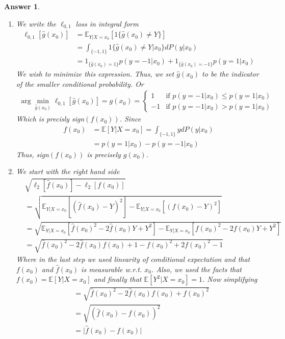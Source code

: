 \documentclass[12pt]{article}
\theoremstyle{colon}
\newtheorem*{answer}{Answer}
\begin{document}
\begin{answer}
  \leavevmode
  \begin{enumerate}[label=\arabic*)]
    \item We write the $\ell_{0,1}$ loss in integral form
      \begin{align*}
        \ell_{0,1}[\widehat{g}(x_0)] &= \mathbb{E}_{Y|X=x_0}[ 1\{ \widehat{g}(x_0) \neq Y \} ] \\
        &= \int_{\{-1,1\}} 1\{ \widehat{g}(x_0) \neq Y | x_0 \} dP(y | x_0) \\
        &=1_{\{ \widehat{g}(x_0) = 1 \}}p(y = -1 | x_0) + 1_{\{ \widehat{g}(x_0) = -1 \}}p(y = 1 | x_0)
      \end{align*}
      We wish to minimize this expression. Thus, we set $\widehat{g}(x_0)$ to be the indicator of the smaller conditional probability. Or
      \begin{gather*}
        \arg\min_{\widehat{g}(x_0)} \ell_{0,1}[\widehat{g}(x_0)] = g(x_0) = \begin{cases}
            1 & \text{if } p(y = -1 | x_0) \leq p(y = 1 | x_0) \\
            -1 & \text{if } p(y = -1 | x_0) > p(y = 1 | x_0)
        \end{cases}
      \end{gather*}
      Which is precisly sign$(f(x_0))$. Since
      \begin{align*}
         f(x_0) &= \mathbb{E}[Y | X = x_0] = \int_{\{-1,1\}} y dP(y | x_0)\\
         &= p(y = 1 | x_0) - p(y = -1 | x_0)
      \end{align*}
      Thus, sign$(f(x_0))$ is precisely $g(x_0)$.

    \item We start with the right hand side
      \begin{align*}
        &  \sqrt{\ell_2[\widehat{f}(x_0)] - \ell_2[f(x_0)]} \\
        &= \sqrt{\mathbb{E}_{Y|X=x_0}[(\widehat{f}(x_0) - Y)^2] - \mathbb{E}_{Y|X=x_0}[(f(x_0) - Y)^2]} \\
        &= \sqrt{\mathbb{E}_{Y|X=x_0}[\widehat{f}(x_0)^2 -2 \widehat{f}(x_0) Y  + Y^2] - \mathbb{E}_{Y|X=x_0}[f(x_0)^2 -2 f(x_0) Y  + Y^2]} \\
        &= \sqrt{\widehat{f}(x_0)^2 -2 \widehat{f}(x_0) f(x_0)  + 1 - f(x_0)^2 + 2 f(x_0)^2  - 1}
      \end{align*}
      Where in the last step we used linearity of conditional expectation and that $f(x_0)$ and $\widehat{f}(x_0)$ is measurable w.r.t. $x_0$. Also, we used the facts that $f(x_0) = \mathbb{E}[Y | X = x_0]$ and finally that $\mathbb{E}[Y^2 | X = x_0] = 1$. Now simplifying
      \begin{align*}
        &= \sqrt{\widehat{f}(x_0)^2 -2 \widehat{f}(x_0) f(x_0)  + f(x_0)^2} \\
        &= \sqrt{(\widehat{f}(x_0) - f(x_0))^2} \\
        &= \lvert \widehat{f}(x_0) - f(x_0) \rvert
      \end{align*}


\end{enumerate}
\end{answer}
\end{document}
